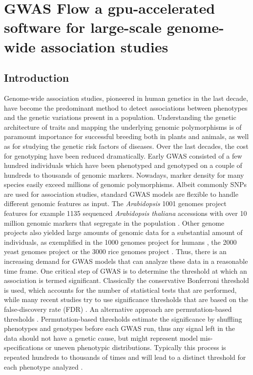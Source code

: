 
\chapter{GWAS Flow a gpu-accelerated software for large-scale genome-wide association studies}

\label{Chapter3} %




\section{Introduction}
Genome-wide association studies, pioneered in human genetics \cite{Hirschhorn2005} in the last decade,
have become the predominant method to detect associations between phenotypes and the genetic variations
present in a population. Understanding the genetic architecture of traits and mapping the underlying genomic
polymorphisms is of paramount importance for successful breeding both in plants and animals, as well as for
studying the genetic risk factors of diseases. 
Over the last decades, the cost for genotyping have been reduced dramatically.
Early GWAS consisted of a few hundred individuals which have been phenotyped and genotyped on a couple of hundreds to thousands of genomic markers. Nowadays, marker density for many species easily exceed millions of genomic polymorphisms. Albeit commonly SNPs are used for association studies, standard GWAS models are flexible to handle different genomic features as input. The \textit{Arabidopsis} 1001 genomes project features for example 1135 sequenced \textit{Arabidopsis thaliana} accessions with over 10 million genomic markers that segregate in the population \cite{1001genome}. Other genome projects also yielded large amounts of genomic data for a substantial amount of individuals, as exemplified in the 1000 genomes project for humans \cite{1000genome}, the 2000 yeast genomes project or the 3000 rice genomes project \cite{3000genome}.
Thus, there is an increasing demand for GWAS models that can analyze these data in a reasonable time frame. 
One critical step of GWAS is to determine the threshold at which an association is termed significant. Classically the conservative Bonferroni threshold is used, which accounts for the number of statistical tests that are performed, while many recent studies try to use significance thresholds that are based on the false-discovery rate (FDR) \cite{Storey9440}. An alternative approach are permutation-based thresholds \cite{che2014adaptive}. Permutation-based thresholds estimate the significance by shuffling phenotypes and genotypes before each GWAS run, thus any signal left in the data should not have a genetic cause, but might represent model mis-specifications or uneven phenotypic distributions. Typically this process is repeated hundreds to thousands of times and will lead to a distinct threshold for each phenotype analyzed \cite{togninalli2017aragwas}.
